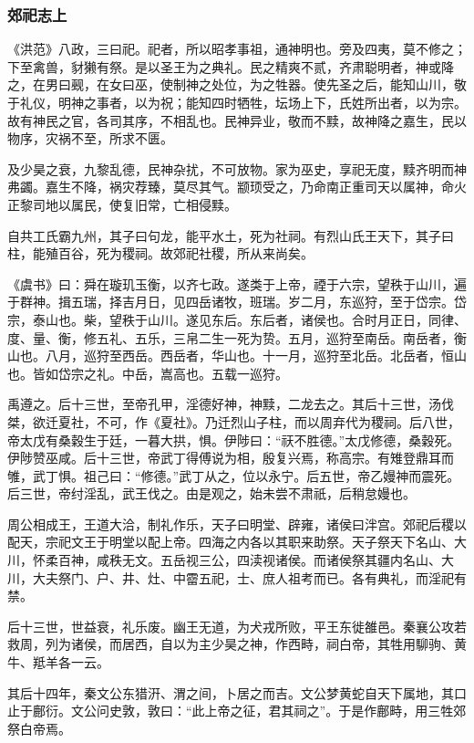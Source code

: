\documentclass[]{article}
\begin{document}
\hypertarget{header-n1695}{%
\subsubsection{郊祀志上}\label{header-n1695}}

《洪范》八政，三曰祀。祀者，所以昭孝事祖，通神明也。旁及四夷，莫不修之；下至禽兽，豺獭有祭。是以圣王为之典礼。民之精爽不贰，齐肃聪明者，神或降之，在男曰觋，在女曰巫，使制神之处位，为之牲器。使先圣之后，能知山川，敬于礼仪，明神之事者，以为祝；能知四时牺牲，坛场上下，氏姓所出者，以为宗。故有神民之官，各司其序，不相乱也。民神异业，敬而不黩，故神降之嘉生，民以物序，灾祸不至，所求不匮。

及少昊之衰，九黎乱德，民神杂扰，不可放物。家为巫史，享祀无度，黩齐明而神弗蠲。嘉生不降，祸灾荐臻，莫尽其气。颛顼受之，乃命南正重司天以属神，命火正黎司地以属民，使复旧常，亡相侵黩。

自共工氏霸九州，其子曰句龙，能平水土，死为社祠。有烈山氏王天下，其子曰柱，能殖百谷，死为稷祠。故郊祀社稷，所从来尚矣。

《虞书》曰：舜在璇玑玉衡，以齐七政。遂类于上帝，禋于六宗，望秩于山川，遍于群神。揖五瑞，择吉月日，见四岳诸牧，班瑞。岁二月，东巡狩，至于岱宗。岱宗，泰山也。柴，望秩于山川。遂见东后。东后者，诸侯也。合时月正日，同律、度、量、衡，修五礼、五乐，三帛二生一死为贽。五月，巡狩至南岳。南岳者，衡山也。八月，巡狩至西岳。西岳者，华山也。十一月，巡狩至北岳。北岳者，恒山也。皆如岱宗之礼。中岳，嵩高也。五载一巡狩。

禹遵之。后十三世，至帝孔甲，淫德好神，神黩，二龙去之。其后十三世，汤伐桀，欲迁夏社，不可，作《夏社》。乃迁烈山子柱，而以周弃代为稷祠。后八世，帝太戊有桑穀生于廷，一暮大拱，惧。伊陟曰：``祆不胜德。''太戊修德，桑穀死。伊陟赞巫咸。后十三世，帝武丁得傅说为相，殷复兴焉，称高宗。有雉登鼎耳而雊，武丁惧。祖己曰：``修德。''武丁从之，位以永宁。后五世，帝乙嫚神而震死。后三世，帝纣淫乱，武王伐之。由是观之，始未尝不肃祇，后稍怠嫚也。

周公相成王，王道大洽，制礼作乐，天子曰明堂、辟雍，诸侯曰泮宫。郊祀后稷以配天，宗祀文王于明堂以配上帝。四海之内各以其职来助祭。天子祭天下名山、大川，怀柔百神，咸秩无文。五岳视三公，四渎视诸侯。而诸侯祭其疆内名山、大川，大夫祭门、户、井、灶、中霤五祀，士、庶人祖考而已。各有典礼，而淫祀有禁。

后十三世，世益衰，礼乐废。幽王无道，为犬戎所败，平王东徙雒邑。秦襄公攻若救周，列为诸侯，而居西，自以为主少昊之神，作西畤，祠白帝，其牲用駠驹、黄牛、羝羊各一云。

其后十四年，秦文公东猎汧、渭之间，卜居之而吉。文公梦黄蛇自天下属地，其口止于鄜衍。文公问史敦，敦曰：``此上帝之征，君其祠之''。于是作鄜畤，用三牲郊祭白帝焉。
\end{document}
